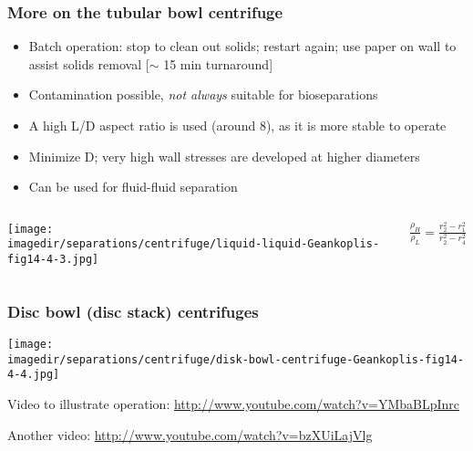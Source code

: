 \begin{frame}\frametitle{More on the tubular bowl centrifuge}
	\begin{itemize}
		\item	Batch operation: stop to clean out solids; restart again; use paper on wall to assist solids removal [$\sim$ 15 min turnaround]
		\item	Contamination possible, \emph{not always} suitable for bioseparations
		\item	A high L/D aspect ratio is used (around 8), as it is more stable to operate
		\item	Minimize D; very high wall stresses are developed at higher diameters
		\item	Can be used for fluid-fluid separation
	\end{itemize}
	\begin{columns}[c]
			\begin{center}
				\texttt{[image: \\imagedir/separations/centrifuge/liquid-liquid-Geankoplis-fig14-4-3.jpg]}
				\\ 
				
				\vspace{-.5cm}
				\qquad{}
			\end{center}
			
				$\displaystyle \frac{\rho_H}{\rho_L} = \displaystyle \frac{r_2^2 - r_1^2}{r_2^2 - r_4^2}$
	\end{columns}
\end{frame}

\begin{frame}\frametitle{Disc bowl (disc stack) centrifuges}
	\begin{center}
		\texttt{[image: \\imagedir/separations/centrifuge/disk-bowl-centrifuge-Geankoplis-fig14-4-4.jpg]}
	\end{center}

	\vspace{0pt}
	Video to illustrate operation: \href{http://www.youtube.com/watch?v=YMbaBLpInrc}{http://www.youtube.com/watch?v=YMbaBLpInrc}

	\vspace{2pt}
	{\tiny Another video: \href{http://www.youtube.com/watch?v=bzXUiLajVlg}{http://www.youtube.com/watch?v=bzXUiLajVlg}}

\end{frame}

